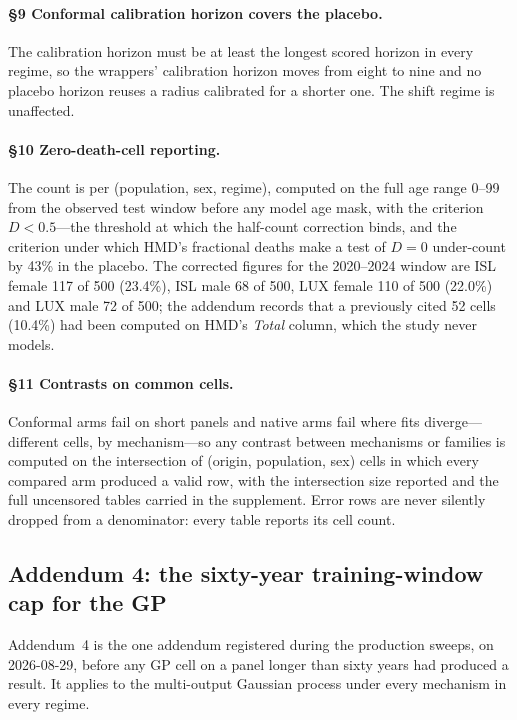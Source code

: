 \paragraph{\S9 Conformal calibration horizon covers the placebo.} The
calibration horizon must be at least the longest scored horizon in every
regime, so the wrappers' calibration horizon moves from eight to nine and no
placebo horizon reuses a radius calibrated for a shorter one. The shift regime
is unaffected.

\paragraph{\S10 Zero-death-cell reporting.} The count is per (population, sex,
regime), computed on the full age range 0--99 from the observed test window
before any model age mask, with the criterion $D<0.5$---the threshold at which
the half-count correction binds, and the criterion under which HMD's
fractional deaths make a test of $D=0$ under-count by 43\% in the placebo. The
corrected figures for the 2020--2024 window are ISL female 117 of 500 (23.4\%),
ISL male 68 of 500, LUX female 110 of 500 (22.0\%) and LUX male 72 of 500; the
addendum records that a previously cited 52 cells (10.4\%) had been computed
on HMD's \emph{Total} column, which the study never models.

\paragraph{\S11 Contrasts on common cells.} Conformal arms fail on short
panels and native arms fail where fits diverge---different cells, by
mechanism---so any contrast between mechanisms or families is computed on the
intersection of (origin, population, sex) cells in which every compared arm
produced a valid row, with the intersection size reported and the full
uncensored tables carried in the supplement. Error rows are never silently
dropped from a denominator: every table reports its cell count.

\subsection{Addendum 4: the sixty-year training-window cap for the GP}
\label{supp:add4}

Addendum~4 is the one addendum registered during the production sweeps, on
2026-08-29, before any GP cell on a panel longer than sixty years had produced
a result. It applies to the multi-output Gaussian process under every
mechanism in every regime.

